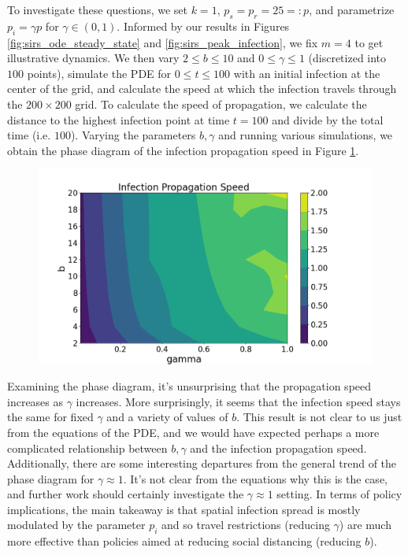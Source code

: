 \documentclass[12pt, reqno]{amsart}
\begin{document}
    To investigate these questions, we set \(k = 1\), \(p_s = p_r = 25 =: p\), and parametrize \(p_i = \gamma p\) for \(\gamma \in (0, 1)\). Informed by our results in Figures \ref{fig:sirs_ode_steady_state} and \ref{fig:sirs_peak_infection}, we fix \(m = 4\) to get illustrative dynamics. We then vary \(2 \leq b \leq 10\) and \(0 \leq \gamma \leq 1\) (discretized into \(100\) points), simulate the PDE for \(0 \leq t \leq 100\) with an initial infection at the center of the grid, and calculate the speed at which the infection travels through the \(200 \times 200\) grid. To calculate the speed of propagation, we calculate the distance to the highest infection point at time \(t = 100\) and divide by the total time (i.e. \(100\)). Varying the parameters \(b, \gamma\) and running various simulations, we obtain the phase diagram of the infection propagation speed in Figure \ref{fig:infection_propagation_speed}.

    \begin{figure}[h]
        \centering
        \includegraphics[scale=0.4]{./sirs_variation/infection_speed_propagation.png}
        \caption{}
        \label{fig:infection_propagation_speed}
    \end{figure}

    Examining the phase diagram, it's unsurprising that the propagation speed increases as \(\gamma\) increases. More surprisingly, it seems that the infection speed stays the same for fixed \(\gamma\) and a variety of values of \(b\). This result is not clear to us just from the equations of the PDE, and we would have expected perhaps a more complicated relationship between \(b, \gamma\) and the infection propagation speed. Additionally, there are some interesting departures from the general trend of the phase diagram for \(\gamma \approx 1\). It's not clear from the equations why this is the case, and further work should certainly investigate the \(\gamma \approx 1\) setting. In terms of policy implications, the main takeaway is that spatial infection spread is mostly modulated by the parameter \(p_i\) and so travel restrictions (reducing \(\gamma\)) are much more effective than policies aimed at reducing social distancing (reducing \(b\)).
\end{document}
